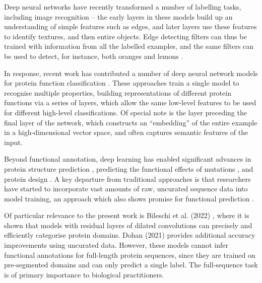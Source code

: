Deep neural networks have recently transformed a number of labelling tasks, including image recognition -- the early layers in these models build up an understanding of simple features such as edges, and later layers use these features to identify textures, and then entire objects. Edge detecting filters can thus be trained with information from all the labelled examples, and the same filters can be used to detect, for instance, both oranges and lemons \cite{activationatlas}.

In response, recent work has contributed a number of deep neural network models for protein function classification \citep{ecpred,deepgo,prolango,deeploc,dspace,deepred,deepre,deepsf,littmann2021embeddings}. These approaches train a single model to recognise multiple properties, building representations of different protein functions via a series of layers, which allow the same low-level features to be used for different high-level classifications. Of special note is the layer preceding the final layer of the network, which constructs an ``embedding'' of the entire example in a high-dimensional vector space, and often captures semantic features of the input. 

Beyond functional annotation, deep learning has enabled significant advances in protein structure prediction \cite{alquraishi2019end, senior2020improved, Yang1496, yang2020improved, du2020energy, rao2021msa}, predicting the functional effects of mutations \cite{riesselman2018deep,rives2019biological,rao2019evaluating,frazer2020large}, and protein design \cite{yang2019machine, mazurenko2019machine, biswas2020low, madani2020progen,elnaggar2020prottrans, anishchenko2020novo, bryant2021deep}. A key departure from traditional approaches is that researchers have started to incorporate vast amounts of raw, uncurated sequence data into model training, an approach which also shows promise for functional prediction \citep{Brandes2021}. 

Of particular relevance to the present work is Bileschi et al. (2022) \citep{bileschi}, where it is shown that models with residual layers \citep{resnet} of dilated convolutions \citep{dilatedconvolutions} can precisely and efficiently categorise protein domains.  Dohan (2021) \cite{dohan2021kdd} provides additional accuracy improvements using uncurated data. However, these models cannot infer functional annotations for full-length protein sequences, since they are trained on pre-segmented domains and can only predict a single label. The full-sequence task is of primary importance to biological practitioners.

